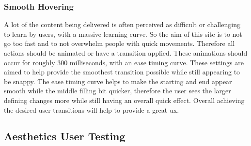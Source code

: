 \subsubsection{Smooth Hovering}
A lot of the content being delivered is often perceived as difficult or challenging to learn by users, with a massive learning curve. So the aim of this site is to not go too fast and to not overwhelm people with quick movements. Therefore all actions should be animated or have a transition applied. These animations should occur for roughly 300 milliseconds, with an ease timing curve. These settings are aimed to help provide the smoothest transition possible while still appearing to be snappy. The ease timing curve helps to make the starting and end appear smooth while the middle filling bit quicker, therefore the user sees the larger defining changes more while still having an overall quick effect. Overall achieving the desired user transitions will help to provide a great \gls{ux}.

\subsection{Aesthetics User Testing}
